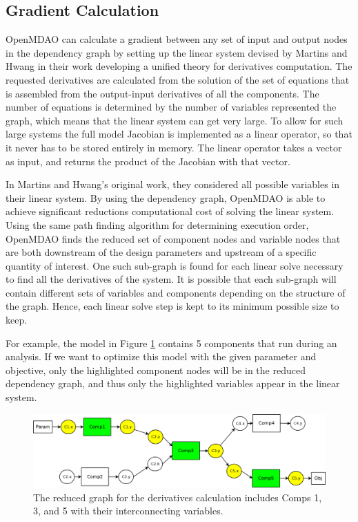 \documentclass[]{aiaa-tc} %
\begin{document}
    \subsection{Gradient Calculation}
    
    OpenMDAO can calculate a gradient between any set of input and output nodes in the
    dependency graph by setting up the linear system devised by Martins and Hwang \cite{Martins2012} in their 
    work developing a unified theory for derivatives computation. 
    The requested derivatives are calculated from the solution of the set of equations that is assembled
    from the output-input derivatives of all the components. The number of equations 
    is determined by the number of variables represented the graph, which means that the linear 
    system can get very large. To allow for such large systems the full model Jacobian is implemented as 
    a linear operator, so that it never has to be stored entirely in memory. The
    linear operator takes a vector as input, and returns the product of the Jacobian with that vector.
    
    In Martins and Hwang's original work, they considered all possible variables in their linear system. 
    By using the dependency graph, OpenMDAO is able to achieve significant reductions computational cost of 
    solving the linear system. Using the same path finding algorithm for determining execution order, 
    OpenMDAO finds the reduced set of component nodes and variable nodes that are both downstream of the design parameters
    and upstream of a specific quantity of interest. One such sub-graph is found for each linear solve necessary to
    find all the derivatives of the system. It is possible that each sub-graph will contain different sets 
    of variables and components depending on the structure of the graph. Hence, each linear solve step 
    is kept to its minimum possible size to keep. 

    For example, the model in Figure \ref{fig:graph2} contains 5 components that run during an analysis. If we
    want to optimize this model with the given parameter and objective, only the highlighted component nodes
    will be in the reduced dependency graph, and thus only the highlighted variables appear in the linear
    system.
    
    \begin{figure}[!htb]\begin{center}
      \includegraphics[width=.8\textwidth]{images/Graph2}
      \caption{ The reduced graph for the derivatives calculation includes Comps 1, 3, and 5 with their interconnecting variables. \label{fig:graph2}}
    \end{center}\end{figure}
\end{document}
